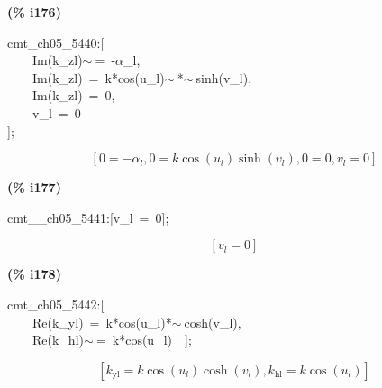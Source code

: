 \documentclass[fleqn]{article}
\begin{document}
\noindent
\begin{minipage}[t]{4.000000em}\color{red}\bfseries
(\% i176)	
\end{minipage}
\begin{minipage}[t]{\textwidth}\color{blue}
cmt\_ch05\_5440:[\\
\ \ \ \ Im(k\_zl)\ensuremath{\sim\ }=\ -\ensuremath{\alpha}\_l,\\
\ \ \ \ Im(k\_zl)\ =\ k*cos(u\_l)\ensuremath{\sim\ }*\ensuremath{\sim\ }sinh(v\_l),\\
\ \ \ \ Im(k\_zl)\ =\ 0,\\
\ \ \ \ v\_l\ =\ 0\\
];
\end{minipage}
\[\displaystyle \tag{\% o176} 
\left[ 0=-{{\alpha }_l}\operatorname{,}0=k \cos{\left( {u_l}\right) } \sinh{\left( {v_l}\right) }\operatorname{,}0=0\operatorname{,}{v_l}=0\right] \mbox{}
\]


\noindent
\begin{minipage}[t]{4.000000em}\color{red}\bfseries
(\% i177)	
\end{minipage}
\begin{minipage}[t]{\textwidth}\color{blue}
cmt\_\_ch05\_5441:[v\_l\ =\ 0];
\end{minipage}
\[\displaystyle \tag{\% o177} 
\left[ {v_l}=0\right] \mbox{}
\]


\noindent
\begin{minipage}[t]{4.000000em}\color{red}\bfseries
(\% i178)	
\end{minipage}
\begin{minipage}[t]{\textwidth}\color{blue}
cmt\_ch05\_5442:[\\
\ \ \ \ Re(k\_yl)\ =\ k*cos(u\_l)*\ensuremath{\sim\ }cosh(v\_l),\\
\ \ \ \ Re(k\_hl)\ensuremath{\sim\ }=\ k*cos(u\_l)\ \ ];
\end{minipage}
\[\displaystyle \tag{\% o178} 
\left[ {k_{\ensuremath{\mathrm{yl}}}}=k \cos{\left( {u_l}\right) } \cosh{\left( {v_l}\right) }\operatorname{,}{k_{\ensuremath{\mathrm{hl}}}}=k \cos{\left( {u_l}\right) }\right] \mbox{}
\]
\end{document}
